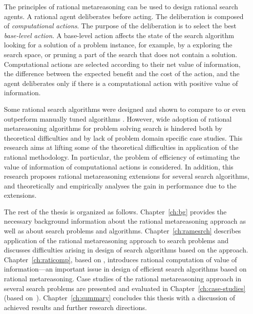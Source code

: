 The principles of rational metareasoning \cite{Russell.right} can be
used to design rational search agents. A rational agent deliberates
before acting. The deliberation is composed of {\em computational
  actions}. The purpose of the deliberation is to select the best {\em
  base-level action}. A base-level action affects the state of the
search algorithm looking for a solution of a problem instance, for
example, by a exploring the search space, or pruning a part of the
search that does not contain a solution. Computational actions are
selected according to their net value of information, the difference
between the expected benefit and the cost of the action, and the agent
deliberates only if there is a computational action with positive
value of information.

Some rational search algorithms were designed and shown to compare to
or even outperform manually tuned algorithms
\cite{Russell.right}. However, wide adoption of rational metareasoning
algorithms for problem solving search is hindered both by theoretical
difficulties and by lack of problem domain specific case studies. This
research aims at lifting some of the theoretical difficulties in
application of the rational methodology. In particular, the problem of
efficiency of estimating the value of information of computational
actions is considered. In addition, this research proposes rational
metareasoning extensions for several search algorithms, and
theoretically and empirically analyses the gain in performance due to
the extensions.

The rest of the thesis is organized as follows. Chapter~\ref{ch:bg}
provides the necessary background information about the rational
metareasoning approach as well as about search problems and
algorithms. Chapter~\ref{ch:ramesrch} describes application of the
rational metareasoning approach to search problems and discusses
difficulties arising in design of search algorithms based on the
approach. Chapter~\ref{ch:raticomp}, based
on \cite{TolpinShimony.raticomp}, introduces rational computation of
value of information---an important issue in design of efficient
search algorithms based on rational metareasoning. Case studies of the
rational metareasoning approach in several search problems are
presented and evaluated in Chapter~\ref{ch:case-studies} (based
on~\cite{TolpinShimony.csp,TolpinShimony.mcts,HayRussellTolpinShimony.selecting,TolpinEtAl.rla}).
Chapter~\ref{ch:summary} concludes this thesis with a discussion of
achieved results and further research directions.
